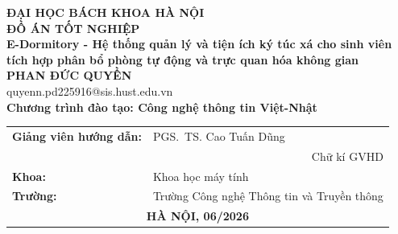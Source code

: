 \documentclass[DoAn.tex]{subfiles}
\begin{document}
\begin{titlepage}
\thispagestyle{empty}
\begin{center}
{\textbf{\large{ĐẠI HỌC BÁCH KHOA HÀ NỘI}}}\\[4cm]
{\textbf{\huge{ĐỒ ÁN TỐT NGHIỆP}}}\\[1cm]
{\textbf{\Large{E-Dormitory - Hệ thống quản lý và tiện ích ký túc xá cho sinh viên
tích hợp phân bổ phòng tự động và trực quan hóa không gian}}}\\[1cm]
{\textbf{\large{PHAN ĐỨC QUYỀN}}}\\
{\large{quyenn.pd225916@sis.hust.edu.vn}}\\[0.5cm]
{\textbf{\large{Chương trình đào tạo: Công nghệ thông tin Việt-Nhật}}}\\
\vfill
\begin{table}[H]
\centering
\begin{tabular}{ll}
\textbf{Giảng viên hướng dẫn:} & PGS.~TS. Cao Tuấn Dũng \hspace{0.5cm} \underline{\hspace{3cm}} \\[0.5cm]
  & \multicolumn{1}{r}{Chữ kí GVHD} \\[0.5cm]
\textbf{Khoa:} & Khoa học máy tính \\[0.5cm]
\textbf{Trường:} & Trường Công nghệ Thông tin và Truyền thông \\[2cm]
\multicolumn{2}{c}{\textbf{HÀ NỘI, 06/2026}}
\end{tabular}
\end{table}
\end{center}
\end{titlepage}
\end{document}
